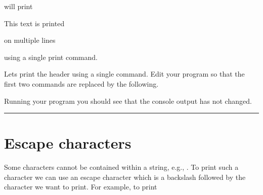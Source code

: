\documentclass[letterpaper,10pt,english]{jupyterBook}
\begin{document}
\begin{sphinxVerbatim}[commandchars=\\\{\}]
\end{sphinxVerbatim}

\sphinxAtStartPar
will print

\begin{sphinxVerbatim}[commandchars=\\\{\}]
This text 
is printed

on multiple lines 


using a single print command.
\end{sphinxVerbatim}

\sphinxAtStartPar
Lets print the header using a single  command. Edit your program so that the first two  commands are replaced by the following.

\begin{sphinxVerbatim}[commandchars=\\\{\}]
\end{sphinxVerbatim}

\sphinxAtStartPar
Running your program you should see that the console output has not changed.


\bigskip\hrule\bigskip



\part{Escape characters}
\label{\detokenize{_pages/1.6_Printing_output:escape-characters}}
\sphinxAtStartPar
Some characters cannot be contained within a string, e.g., . To print such a character we can use an escape character which is a backslash \sphinxcode{\sphinxupquote{\textbackslash{}}} followed by the character we want to print. For example, to print
\end{document}
